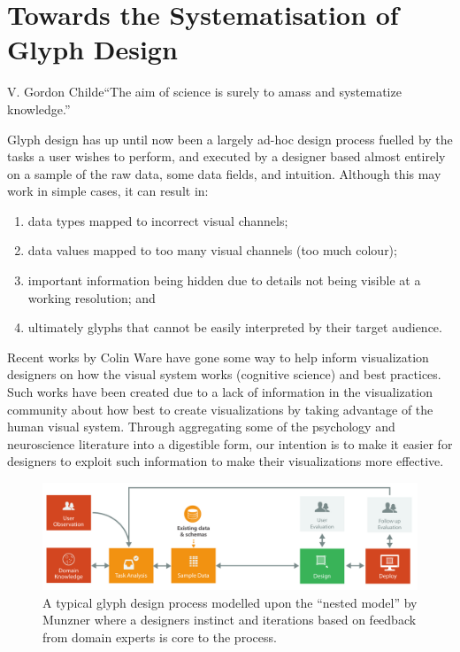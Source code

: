 \chapter{Towards the Systematisation of Glyph Design}
\label{chap:strategies}

\begin{chapquote}{V. Gordon Childe}{``The aim of science is surely to amass and systematize knowledge.''}
\end{chapquote}

Glyph design has up until now been a largely ad-hoc design process fuelled by the tasks a user wishes to perform, and executed by a designer based almost entirely on a sample of the raw data, some data fields, and intuition. 
Although this may work in simple cases, it can result in: 
\begin{enumerate}
\item data types mapped to incorrect visual channels; 
\item data values mapped to too many visual channels (\eg too much colour); 
\item important information being hidden due to details not being visible at a working resolution; and 
\item ultimately glyphs that cannot be easily interpreted by their target audience. 
\end{enumerate}

Recent works by Colin Ware \cite{ware13} have gone some way to help inform visualization designers on how the visual system works (cognitive science) and best practices. 
Such works have been created due to a lack of information in the visualization community about how best to create visualizations by taking advantage of the human visual system.
Through aggregating some of the psychology and neuroscience literature into a digestible form, our intention is to make it easier for designers to exploit such information to make their visualizations more effective.
%

\begin{figure}[t!]
\centering
\includegraphics[width=\textwidth]{images/ch3/model_horizontal_simple}
\caption{A typical glyph design process modelled upon the ``nested model'' by Munzner \cite{munzner2009nested} where a designers instinct and iterations based on feedback from domain experts is core to the process.}
\label{fig:simple_process}
\end{figure}


